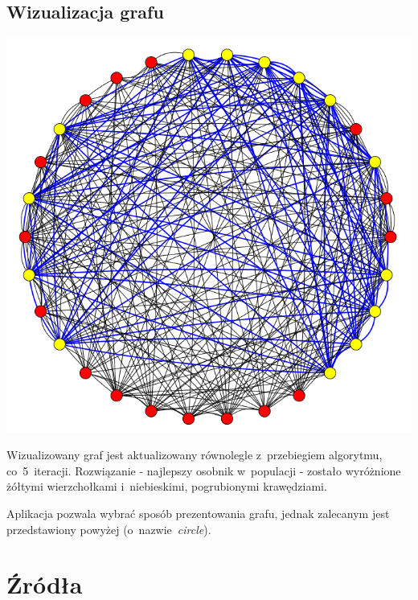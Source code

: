 \documentclass[11pt]{aghdpl}
\begin{document}
\section{Wizualizacja grafu}
\label{sec:visualization}

\includegraphics[width=16cm]{graf}

Wizualizowany graf jest aktualizowany równolegle z~przebiegiem algorytmu, co~5~iteracji. Rozwiązanie - najlepszy osobnik w~populacji - 
zostało wyróżnione żółtymi wierzchołkami i~niebieskimi, pogrubionymi krawędziami.

Aplikacja pozwala wybrać sposób prezentowania grafu, jednak zalecanym jest przedstawiony powyżej (o~nazwie~\textit{circle}).

\chapter{Źródła} 
\label{cha:sources}
\end{document}
